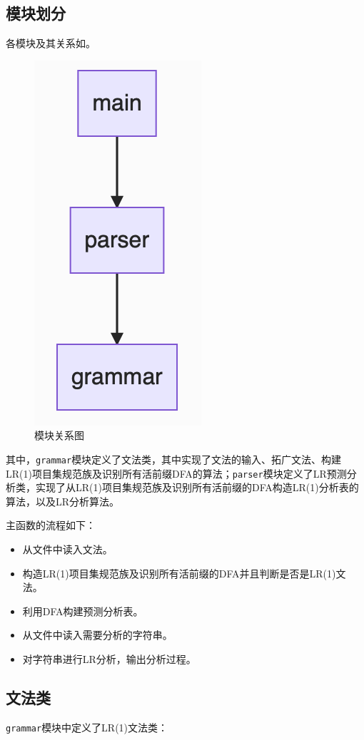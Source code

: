 \documentclass[lang=cn,11pt,a4paper,cite=authornum]{paper}
\begin{document}
\subsection{模块划分}

各模块及其关系如。

\begin{figure}[htbp]

    \centering
    \includegraphics[width=0.15\linewidth]{./images/structure.png}
    \caption{模块关系图\label{fig:structure}}

\end{figure}

其中，\texttt{grammar}模块定义了文法类，其中实现了文法的输入、拓广文法、构建LR(1)项目集规范族及识别所有活前缀DFA的算法；\texttt{parser}模块定义了LR预测分析类，实现了从LR(1)项目集规范族及识别所有活前缀的DFA构造LR(1)分析表的算法，以及LR分析算法。

主函数的流程如下：

\begin{itemize}
    \item 从文件中读入文法。
    \item 构造LR(1)项目集规范族及识别所有活前缀的DFA并且判断是否是LR(1)文法。
    \item 利用DFA构建预测分析表。
    \item 从文件中读入需要分析的字符串。
    \item 对字符串进行LR分析，输出分析过程。
\end{itemize}

\subsection{文法类}

\texttt{grammar}模块中定义了LR(1)文法类：
\end{document}
